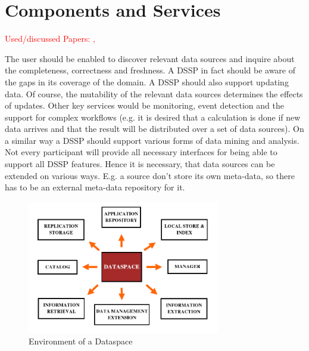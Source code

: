 \section{Components and Services}
\textcolor{red}{ Used/discussed Papers: \cite{1698348}, \cite{Halevy:2006:PDS:1142351.1142352}}

 The user should be enabled to discover relevant data sources and inquire about the completeness, correctness and freshness. A DSSP in fact should be aware of the gaps in its coverage of the domain.  
A DSSP should also support updating data. Of course, the mutability of the relevant data sources determines the effects of updates.  
Other key services would be monitoring, event detection and the support for complex workflows (e.g. it is desired that a calculation is done if new data arrives and that the result will be distributed over a set of data sources). On a similar way a DSSP should support various forms of data mining and analysis. 
Not every participant will provide all necessary interfaces for being able to support all DSSP features. Hence it is necessary, that data sources can be extended on various ways. E.g. a source don't store its own meta-data, so there has to be an external meta-data repository for it. 

\begin{figure}[H]
	\begin{center}
		\includegraphics[width=0.75\textwidth]{figures/TowardsRealizationOfDataspaces1.png}
	\end{center}
	\caption{Environment of  a Dataspace}
	\label{TowardsRealizationOfDataspacesEnvironment}
\end{figure}

